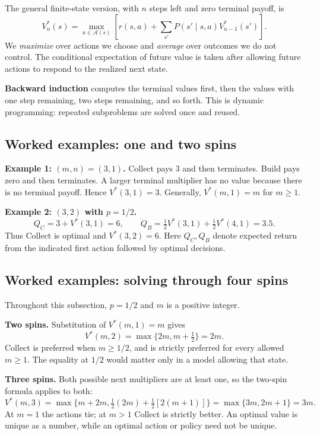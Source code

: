 \documentclass[11pt]{article}
\theoremstyle{remark}\newtheorem{remark}[definition]{Remark}
\begin{document}
The general finite-state version, with $n$ steps left and zero terminal payoff, is
\[
V_n^*(s)=\max_{a\in\mathcal A(s)}
\left[r(s,a)+\sum_{s'}P(s'\mid s,a)V_{n-1}^*(s')\right].
\]
We \emph{maximize} over actions we choose and \emph{average} over outcomes we do not control. The conditional expectation of future value is taken after allowing future actions to respond to the realized next state.

\textbf{Backward induction} computes the terminal values first, then the values with one step remaining, two steps remaining, and so forth. This is dynamic programming: repeated subproblems are solved once and reused.

\subsection{Worked examples: one and two spins}
\textbf{Example 1: $(m,n)=(3,1)$.} Collect pays $3$ and then terminates. Build pays zero and then terminates. A larger terminal multiplier has no value because there is no terminal payoff. Hence $V^*(3,1)=3$. Generally, $V^*(m,1)=m$ for $m\geq1$.

\textbf{Example 2: $(3,2)$ with $p=1/2$.}
\[
Q_C=3+V^*(3,1)=6,\qquad
Q_B=\tfrac12 V^*(3,1)+\tfrac12 V^*(4,1)=3.5.
\]
Thus Collect is optimal and $V^*(3,2)=6$. Here $Q_C,Q_B$ denote expected return from the indicated first action followed by optimal decisions.

\newpage
\subsection{Worked examples: solving through four spins}
Throughout this subsection, $p=1/2$ and $m$ is a positive integer.

\textbf{Two spins.} Substitution of $V^*(m,1)=m$ gives
\[
V^*(m,2)=\max\{2m,m+\tfrac12\}=2m.
\]
Collect is preferred when $m\geq1/2$, and is strictly preferred for every allowed $m\geq1$. The equality at $1/2$ would matter only in a model allowing that state.

\textbf{Three spins.} Both possible next multipliers are at least one, so the two-spin formula applies to both:
\[
V^*(m,3)=\max\{m+2m,\tfrac12(2m)+\tfrac12[2(m+1)]\}
=\max\{3m,2m+1\}=3m.
\]
At $m=1$ the actions tie; at $m>1$ Collect is strictly better. An optimal value is unique as a number, while an optimal action or policy need not be unique.
\end{document}
